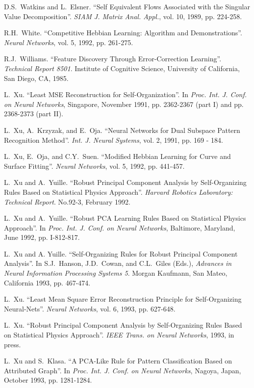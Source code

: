 \begin{thebibliography}{999}
D.S.~Watkins and L.~Elsner.
``Self Equivalent Flows Associated with the Singular Value Decomposition''.
{\em SIAM J. Matrix Anal. Appl.}, vol. 10, 1989, pp. 224-258.
 
R.H.~White.
``Competitive Hebbian Learning: Algorithm and Demonstrations''.
{\em Neural Networks}, vol. 5, 1992, pp. 261-275.

R.J.~Williams.
``Feature Discovery Through Error-Correction Learning''.
{\em Technical Report 8501}. Institute of Cognitive 
Science, University of California, San Diego, CA, 1985.

L.~Xu. 
``Least MSE Reconstruction for Self-Organization''.
In {\em Proc. Int. J. Conf. on Neural Networks}, Singapore, November 1991,
pp. 2362-2367 (part I) and pp. 2368-2373 (part II).

L.~Xu, A.~Krzyzak, and E.~Oja.
``Neural Networks for Dual Subspace Pattern Recognition Method''.
{\em Int. J. Neural Systems}, vol. 2, 1991, pp. 169 - 184.

L.~Xu, E.~Oja, and C.Y.~Suen.
``Modified Hebbian Learning for Curve and Surface Fitting''.
{\em Neural Networks}, vol. 5, 1992, pp. 441-457.
 
L.~Xu and A.~Yuille. 
``Robust Principal Component Analysis by Self-Organizing
Rules Based on Statistical Physics Approach''.
{\em Harvard Robotics Laboratory: Technical Report}. No.92-3, February 1992.

L.~Xu and A.~Yuille. 
``Robust PCA Learning Rules Based on Statistical Physics Approach''.
In {\em Proc. Int. J. Conf. on Neural Networks}, Baltimore, Maryland,
June 1992, pp. I-812-817.
 
L.~Xu and A. Yuille.
``Self-Organizing Rules for Robust Principal Component Analysis''.
In S.J.~Hanson, J.D.~Cowan, and C.L.~Giles (Eds.), {\em Advances
in Neural Information Processing Systems 5}. Morgan Kaufmann, San Mateo, 
California 1993, pp. 467-474.

L.~Xu.
``Least Mean Square Error Reconstruction Principle for Self-Organizing 
 Neural-Nets''.
{\em Neural Networks}, vol. 6, 1993, pp. 627-648. 
 
L.~Xu.
``Robust Principal Component Analysis by Self-Organizing
Rules Based on Statistical Physics Approach''.
{\em IEEE Trans. on Neural Networks}, 1993, in press.

L.~Xu and S.~Klasa.
``A PCA-Like Rule for Pattern Classification Based on Attributed Graph''.
In {\em Proc. Int. J. Conf. on Neural Networks}, Nagoya, Japan, October
1993, pp. 1281-1284.


\end{thebibliography}
